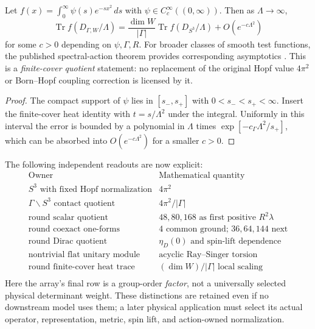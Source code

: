 \documentclass[11pt]{article}
\begin{document}
\begin{corollary}
\label{p1b:cor:v13-spectral-action-scale}
Let $f(x)=\int_0^\infty\psi(s)e^{-s x^2}\,ds$ with
$\psi\in C_c^\infty((0,\infty))$. Then as $\Lambda\to\infty$,
\begin{equation}
\label{p1b:eq:v13-spectral-action-scale}
 \boxed{\operatorname{Tr}f(D_{\Gamma,W}/\Lambda)
 =\frac{\dim W}{|\Gamma|}\operatorname{Tr}f(D_{S^3}/\Lambda)
 +O(e^{-c\Lambda^2})}
\end{equation}
for some $c>0$ depending on $\psi,\Gamma,R$.  For broader classes
of smooth test functions, the published spectral-action theorem
provides corresponding asymptotics
\cite{CacicMarcolliTeh2014CosmicTopology}.
This is a \emph{finite-cover quotient} statement: no replacement of
the original Hopf value $4\pi^2$ or Born--Hopf coupling correction
is licensed by it.
\end{corollary}
\begin{proof}
The compact support of $\psi$ lies in $[s_-,s_+]$ with
$0<s_-<s_+<\infty$.  Insert the finite-cover heat identity with
$t=s/\Lambda^2$ under the integral. Uniformly in this interval the
error is bounded by a polynomial in $\Lambda$ times
$\exp[-c_\Gamma\Lambda^2/s_+]$, which can be absorbed into
$O(e^{-c\Lambda^2})$ for a smaller $c>0$.
\end{proof}

\begin{remark}
\label{p1b:rem:v13-observable-atlas}
The following independent readouts are now explicit:
\[
\begin{array}{c|l}
\text{Owner} & \text{Mathematical quantity}\\\hline
S^3\text{ with fixed Hopf normalization} & 4\pi^2\\
\Gamma\backslash S^3\text{ contact quotient} & 4\pi^2/|\Gamma|\\
\text{round scalar quotient} & 48,80,168\text{ as first positive }R^2\lambda\\
\text{round coexact one-forms} & 4\text{ common ground; }36,64,144\text{ next}\\
\text{round Dirac quotient} & \eta_D(0)\text{ and spin-lift dependence}\\
\text{nontrivial flat unitary module} & \text{acyclic Ray--Singer torsion}\\
\text{round finite-cover heat trace} & (\dim W)/|\Gamma|\text{ local scaling}\\
\end{array}
\]
Here the array's final row is a group-order \emph{factor}, not a
universally selected physical determinant weight.  These distinctions
are retained even if no downstream model uses them; a later physical
application must select its actual operator, representation, metric,
spin lift, and action-owned normalization.
\end{remark}
\end{document}
